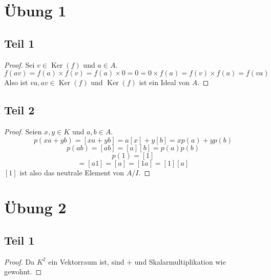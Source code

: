 \documentclass[10pt,a4paper]{article}
\DeclareMathOperator{\Ker}{Ker}
\begin{document}
\section*{Übung 1}

\subsection*{Teil 1}

\begin{proof}
Sei $v \in \Ker(f)$ und $a \in A$.
\begin{equation}
f(av) = f(a) \times f(v) = f(a) \times 0 = 0 = 0 \times f(a) = f(v) \times f(a) = f(va)
\end{equation}
Also ist $va, av \in \Ker(f)$ und $\Ker(f)$ ist ein Ideal von $A$.
\end{proof}

\subsection*{Teil 2}

\begin{proof}
Seien $x, y \in K$ und $a, b \in A$.
\begin{equation}
p(xa + yb) = [xa + yb] = a[x] + y[b] = xp(a) + yp(b)
\end{equation}
\begin{equation}
p(ab) = [ab] = [a][b] = p(a) p(b)
\end{equation}
\begin{equation}
p(1) = [1]
\end{equation}
\begin{equation}
[a][1] = [a1] = [a] = [1a] = [1][a]
\end{equation}
$[1]$ ist also das neutrale Element von $A/I$.
\end{proof}

\section*{Übung 2}

\subsection*{Teil 1}

\begin{proof}
Da $K^{2}$ ein Vektorraum ist, sind $+$ und Skalarmultiplikation wie gewohnt.

\end{proof}
\end{document}
